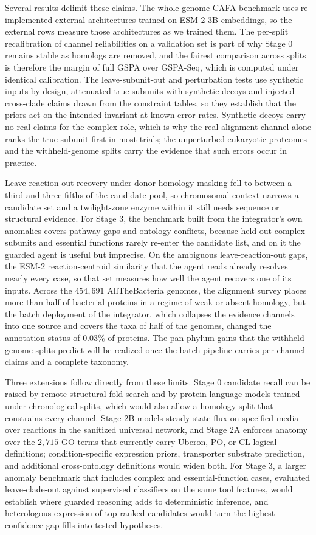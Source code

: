 \documentclass[10pt,twocolumn]{article}
\begin{document}
Several results delimit these claims. The whole-genome CAFA benchmark uses re-implemented external architectures trained on ESM-2 3B embeddings, so the external rows measure those architectures as we trained them. The per-split recalibration of channel reliabilities on a validation set is part of why Stage 0 remains stable as homologs are removed, and the fairest comparison across splits is therefore the margin of full GSPA over GSPA-Seq, which is computed under identical calibration. The leave-subunit-out and perturbation tests use synthetic inputs by design, attenuated true subunits with synthetic decoys and injected cross-clade claims drawn from the constraint tables, so they establish that the priors act on the intended invariant at known error rates. Synthetic decoys carry no real claims for the complex role, which is why the real alignment channel alone ranks the true subunit first in most trials; the unperturbed eukaryotic proteomes and the withheld-genome splits carry the evidence that such errors occur in practice.

Leave-reaction-out recovery under donor-homology masking fell to between a third and three-fifths of the candidate pool, so chromosomal context narrows a candidate set and a twilight-zone enzyme within it still needs sequence or structural evidence. For Stage 3, the benchmark built from the integrator's own anomalies covers pathway gaps and ontology conflicts, because held-out complex subunits and essential functions rarely re-enter the candidate list, and on it the guarded agent is useful but imprecise. On the ambiguous leave-reaction-out gaps, the ESM-2 reaction-centroid similarity that the agent reads already resolves nearly every case, so that set measures how well the agent recovers one of its inputs. Across the $454{,}691$ AllTheBacteria genomes, the alignment survey places more than half of bacterial proteins in a regime of weak or absent homology, but the batch deployment of the integrator, which collapses the evidence channels into one source and covers the taxa of half of the genomes, changed the annotation status of $0.03\%$ of proteins. The pan-phylum gains that the withheld-genome splits predict will be realized once the batch pipeline carries per-channel claims and a complete taxonomy.

Three extensions follow directly from these limits. Stage 0 candidate recall can be raised by remote structural fold search and by protein language models trained under chronological splits, which would also allow a homology split that constrains every channel. Stage 2B models steady-state flux on specified media over reactions in the sanitized universal network, and Stage 2A enforces anatomy over the $2{,}715$ GO terms that currently carry Uberon, PO, or CL logical definitions; condition-specific expression priors, transporter substrate prediction, and additional cross-ontology definitions would widen both. For Stage 3, a larger anomaly benchmark that includes complex and essential-function cases, evaluated leave-clade-out against supervised classifiers on the same tool features, would establish where guarded reasoning adds to deterministic inference, and heterologous expression of top-ranked candidates would turn the highest-confidence gap fills into tested hypotheses.
\end{document}

